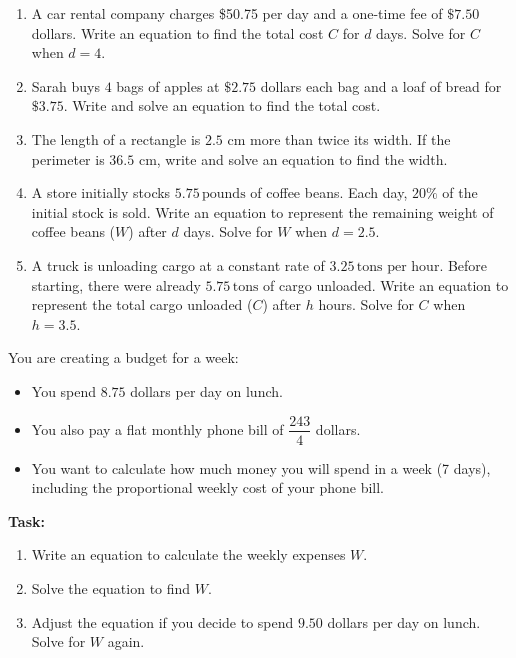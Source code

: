 \documentclass[12pt]{article}
\begin{document}
\begin{tcolorbox}[colframe=black!60, colback=white, 
coltitle=black, colbacktitle=black!15, fonttitle=\bfseries\Large, 
title=Problems, halign title=center, left=10pt, right=10pt, top=10pt, bottom=80pt]
\begin{enumerate}[start=9, itemsep=6em]
    \item A car rental company charges \$50.75 per day and a one-time fee of \( \$7.50 \) dollars. Write an equation to find the total cost \(C\) for \(d\) days. Solve for \(C\) when \(d = 4\).
    \item Sarah buys \( 4 \) bags of apples at \( \$2.75 \) dollars each bag and a loaf of bread for \(\$3.75\). Write and solve an equation to find the total cost.
    \item The length of a rectangle is \( 2.5 \) cm more than twice its width. If the perimeter is \( 36.5 \) cm, write and solve an equation to find the width.
   \item A store initially stocks \( 5.75 \, \text{pounds} \) of coffee beans. Each day, \( 20\% \) of the initial stock is sold. Write an equation to represent the remaining weight of coffee beans (\(W\)) after \(d\) days. Solve for \(W\) when \(d = 2.5\).


   \item A truck is unloading cargo at a constant rate of \( 3.25 \, \text{tons per hour} \). Before starting, there were already \( 5.75 \, \text{tons} \) of cargo unloaded. Write an equation to represent the total cargo unloaded (\(C\)) after \(h\) hours. Solve for \(C\) when \(h = 3.5\).

\end{enumerate}
\end{tcolorbox}

\vspace{1em}

\begin{tcolorbox}[colframe=black!60, colback=white, 
coltitle=black, colbacktitle=black!15, fonttitle=\bfseries\Large, 
title=Performance Task: Planning a Weekly Budget, halign title=center, left=10pt, right=10pt, top=10pt, bottom=100pt]
You are creating a budget for a week:
\begin{itemize}
    \item You spend \( 8.75 \) dollars per day on lunch.
    \item You also pay a flat monthly phone bill of \( \dfrac{243}{4} \) dollars.
    \item You want to calculate how much money you will spend in a week (7 days), including the proportional weekly cost of your phone bill.
\end{itemize}
\textbf{Task:}
\begin{enumerate}[itemsep=4em]
    \item Write an equation to calculate the weekly expenses \(W\).
    \item Solve the equation to find \(W\).
    \item Adjust the equation if you decide to spend \( 9.50 \) dollars per day on lunch. Solve for \(W\) again.
\end{enumerate}
\end{tcolorbox}
\end{document}
